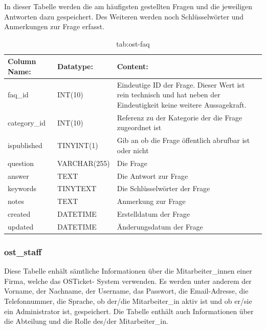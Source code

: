 In dieser Tabelle werden die am häufigsten gestellten Fragen und die jeweiligen Antworten dazu gespeichert. Des Weiteren werden noch Schlüsselwörter und Anmerkungen zur Frage erfasst.

\begin{table}[h]
	\begin{tabular}{|p{3.5cm}|p{4cm}|p{6.2cm}|}
		\hline
		\textbf{Column Name:} & \textbf{Datatype:} & \textbf{Content:}\\
		\hline
		faq\_id & INT(10) & Eindeutige ID der Frage. Dieser Wert ist rein technisch und hat  neben der Eindeutigkeit keine weitere 
		Aussagekraft.\\
		\hline
		category\_id & INT(10) & Referenz zu der Kategorie der die Frage zugeordnet ist  \\
		\hline
		ispublished & TINYINT(1) & Gib an ob die Frage öffentlich abrufbar ist oder nicht\\
		\hline
		question & VARCHAR(255) & Die Frage\\
		\hline
		answer & TEXT & Die Antwort zur Frage\\
		\hline
		keywords & TINYTEXT & Die Schlüsselwörter der Frage \\
		\hline
		notes & TEXT & Anmerkung zur Frage\\
		\hline
		created & DATETIME & Erstelldatum der Frage\\
		\hline
		updated & DATETIME & Änderungsdatum der Frage\\
		\hline
	\end{tabular}
	\caption{tab:ost-faq}
\end{table}
\label{tab:ost_faq}

\newpage

\subsubsection{ost\_staff}

Diese Tabelle enhält sämtliche Informationen über die  Mitarbeiter\_innen einer Firma, welche das OSTicket- System verwenden. Es werden unter anderem der Vorname, der Nachname, der Username, das Passwort, die Email-Adresse, die Telefonnummer, die Sprache, ob der/die Mitarbeiter\_in aktiv ist und ob er/sie ein Administrator ist, gespeichert.
Die Tabelle enthält auch Informationen über die Abteilung und die Rolle des/der Mitarbeiter\_in.


